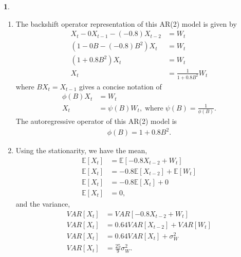 \documentclass[10pt]{article}
\newtheorem{prob}{\bm{$Problem$}}
\begin{document}
\begin{prob}
\end{prob}
\begin{enumerate}[1)]
\vspace{3mm}

\item
The backshift operator representation of this AR(2) model is given by
\begin{align*}
X_t-0X_{t-1}-(-0.8)X_{t-2}&=W_t\\
(1-0B-(-0.8)B^2)X_t&=W_t\\
(1+0.8B^2)X_t&=W_t\\
X_t&=\frac{1}{1+0.8B^2}W_t
\end{align*}
where $BX_t=X_{t-1}$ gives a concise notation of
\begin{align*}
\phi(B)X_t&=W_t\\
X_t&=\psi(B)W_t,\;\textrm{where}\;\psi(B)=\frac{1}{\phi(B)}.
\end{align*}
The autoregressive operator of this AR(2) model is
\begin{align*}
\phi(B)=1+0.8B^2.
\end{align*}
\vspace{3mm}

\item
Using the stationarity, we have the mean,
\begin{align*}
\mathbb{E}[X_t]&=\mathbb{E}[-0.8X_{t-2}+W_t]\\
\mathbb{E}[X_t]&=-0.8\mathbb{E}[X_{t-2}]+\mathbb{E}[W_t]\\
\mathbb{E}[X_t]&=-0.8\mathbb{E}[X_t]+0\\
\mathbb{E}[X_t]&=0,
\end{align*}
and the variance,
\begin{align*}
VAR[X_t]&=VAR[-0.8X_{t-2}+W_t]\\
VAR[X_t]&=0.64VAR[X_{t-2}]+VAR[W_t]\\
VAR[X_t]&=0.64VAR[X_t]+\sigma^2_W\\
VAR[X_t]&=\frac{25}{9}\sigma^2_W.
\end{align*}
\vspace{3mm}


\end{enumerate}
\end{document}
